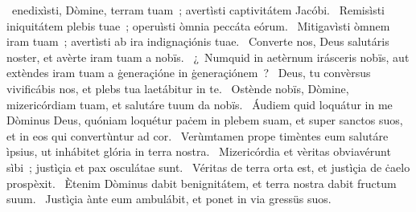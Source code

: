 { }
{%
~enedixìsti, Dòmine, terram tuam~; avertìsti captivitátem Jacóbi. 
~Remisìsti iniquitátem plebis tuae~; operuìsti òmnia peccáta eórum. 
~Mitigavìsti òmnem iram tuam~; avertìsti ab ira indignaçiónis tuae. 
~Converte nos, Deus salutáris noster, et avèrte iram tuam a nobïs. 
~¿~Numquid in aetèrnum irásceris nobïs, aut extèndes iram tuam a ġeneraçióne in ġeneraçiónem~? 
~Deus, tu convèrsus vivificábis nos, et plebs tua laetábitur in te. 
~Ostènde nobïs, Dòmine, mizericórdiam tuam, et salutáre tuum da nobïs. 
~Áudiem quid loquátur in me Dòminus Deus, quóniam loquétur paċem in plebem suam, et super sanctos suos, et in eos qui convertùntur ad cor. 
~Verùmtamen prope timèntes eum salutáre ìpsius, ut inhábitet glória in terra nostra. 
~Mizericórdia et vèritas obviavérunt sìbi~; justìçia et pax osculátae sunt. 
~Véritas de terra orta est, et justìçia de ċaelo prospèxit. 
~Ètenim Dòminus dabit benignitátem, et terra nostra dabit fructum suum. 
~Justìçia ànte eum ambulábit, et ponet in via gressüs suos. 
}
